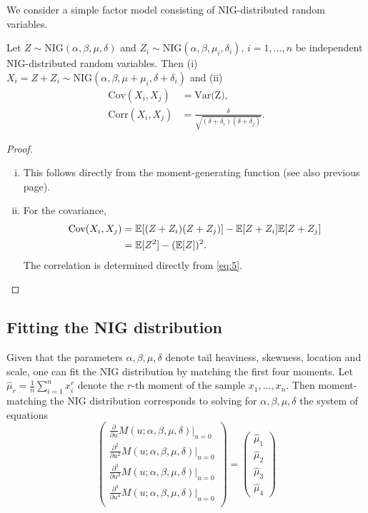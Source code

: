 We consider a simple factor model consisting of NIG-distributed random
variables.
\begin{proposition}
  Let $Z\sim \text{NIG}(\alpha, \beta, \mu, \delta)$ and
  $Z_i\sim \text{NIG}(\alpha, \beta, \mu_i, \delta_i)$,
  $i=1,\ldots, n$ be independent NIG-distributed random
  variables. Then (i) 
  $X_i = Z + Z_i\sim \text{NIG}(\alpha,\beta,\mu+\mu_i,
  \delta+\delta_i)$ and (ii)
  \begin{align}
    \text{Cov}(X_i,X_j) &= \text{Var(Z)},\nonumber\\
    \text{Corr}(X_i,X_j) &= \frac{\delta}{\sqrt{(\delta+\delta_i)
                           (\delta+\delta_j)}}. \label{eq:6}
  \end{align}
\end{proposition}
\begin{proof}
  \begin{enumerate}[(i)]
  \item This follows directly from the moment-generating function (see
    also previous page). 
  \item For the covariance,
    \begin{align*}
      \text{Cov}(X_i,X_j)
      &= {\mathbb{E}}[(Z+Z_i) (Z+Z_j)] - {\mathbb{E}}[Z+Z_i] {\mathbb{E}}[Z+Z_j]\\
      &= {\mathbb{E}}[Z^2] -({\mathbb{E}}[Z])^2.
    \end{align*}
    The correlation is determined directly from \eqref{eq:5}. 
  \end{enumerate}
\end{proof}

\subsection{Fitting the NIG distribution}
\label{sec:fitt-nig-distr}

Given that the parameters $\alpha, \beta, \mu, \delta$ denote tail
heaviness, skewness, location and scale, one can fit the NIG
distribution by matching the first four moments. Let
$\hat\mu_r=\frac{1}{n} \sum_{i=1}^n x_i^r$ denote the $r$-th moment of
the sample $x_1, \ldots, x_n$. Then moment-matching the NIG
distribution corresponds to solving for $\alpha, \beta, \mu, \delta$
the system of equations
\begin{equation*}
  \begin{pmatrix}
    \frac{\partial}{\partial u} M(u; \alpha, \beta, \mu,
    \delta)|_{u=0}\\[5pt]
    \frac{\partial^2}{\partial u^2} M(u; \alpha, \beta, \mu,
    \delta)|_{u=0}\\[5pt]
    \frac{\partial^3}{\partial u^3} M(u; \alpha, \beta, \mu,
    \delta)|_{u=0}\\[5pt]
    \frac{\partial^4}{\partial u^4} M(u; \alpha, \beta, \mu,
    \delta)|_{u=0}\\
  \end{pmatrix}
  =
  \begin{pmatrix}
    \hat\mu_1\\[5pt]
    \hat\mu_2\\[5pt]
    \hat\mu_3\\[5pt]
    \hat\mu_4
  \end{pmatrix}
\end{equation*}


